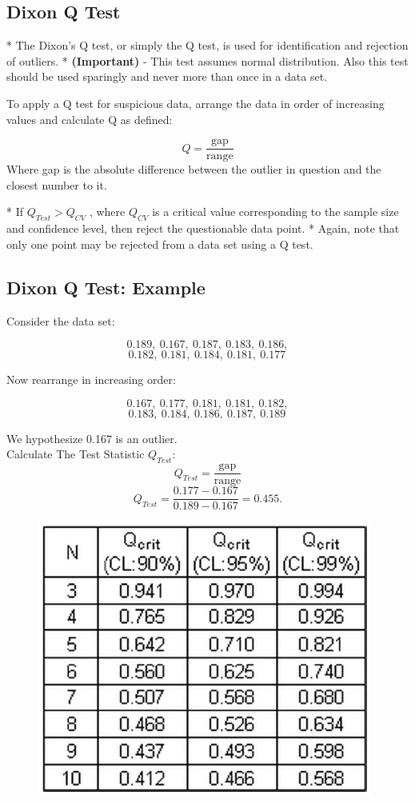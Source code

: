 \subsection{Dixon Q Test}

*  The Dixon's Q test, or simply the Q test, is used for identification and rejection of outliers. 
*  \textbf{(Important)} - This test assumes normal distribution. Also this test should be used sparingly and never more than once in a data set. 


To apply a Q test for suspicious data, arrange the data in order of increasing values and calculate Q as defined:

\[ Q = \frac{\text{gap}}{\text{range}} \]
Where gap is the absolute difference between the outlier in question and the closest number to it. 



*  If $Q_{Test} > Q_{CV}$ , where $Q_{CV}$ is a critical value corresponding to the sample size and confidence level, then reject the questionable data point. 
*  Again, note that only one point may be rejected from a data set using a Q test.




\subsection{Dixon Q Test: Example}
Consider the data set:
\begin{framed}
\[0.189,\ 0.167,\ 0.187,\ 0.183,\ 0.186,\]\[ 0.182,\ 0.181,\ 0.184,\ 0.181,\ 0.177 \,\]
\end{framed}
Now rearrange in increasing order:
\begin{framed}
\[0.167,\ 0.177,\ 0.181,\ 0.181,\ 0.182,\]\[ 0.183,\ 0.184,\ 0.186,\ 0.187,\ 0.189 \, \]
\end{framed}


We hypothesize 0.167 is an outlier. \\ Calculate The Test Statistic $Q_{Test}$:
{
\[ Q_{Test}=\frac{\text{gap}}{\text{range}}  \]
\[ Q_{Test} 
= \frac{0.177-0.167}{0.189-0.167}=0.455.\]
}


\begin{figure}
\centering
\includegraphics[width=0.5\linewidth]{images/DixonQTestTables}
\caption{}
\label{fig:dixonqtesttables}
\end{figure}

